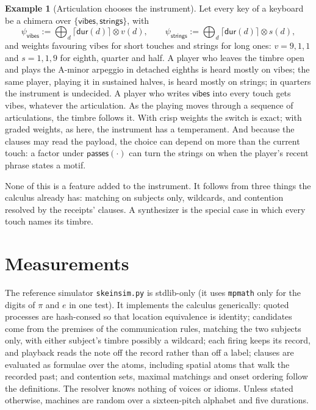 \documentclass[11pt,a4paper]{article}
\theoremstyle{plain}
\theoremstyle{definition}
\newtheorem{example}[theorem]{Example}
\theoremstyle{remark}
\newcommand{\tensorv}{\otimes}
\newcommand{\crisp}[1]{\lceil #1 \rceil}
\newcommand{\atm}[1]{\mathsf{#1}}
\begin{document}
\begin{example}[Articulation chooses the instrument]\label{ex:chimera}
Let every key of a keyboard be a chimera over $\{\mathsf{vibes},
\mathsf{strings}\}$, with
\[
\psi_{\mathsf{vibes}} := \bigoplus_d \crisp{\atm{dur}(d)} \tensorv v(d),
\qquad
\psi_{\mathsf{strings}} := \bigoplus_d \crisp{\atm{dur}(d)} \tensorv s(d),
\]
and weights favouring vibes for short touches and strings for long ones:
$v = 9, 1, 1$ and $s = 1, 1, 9$ for eighth, quarter and half. A player who
leaves the timbre open and plays the A-minor arpeggio in detached eighths is
heard mostly on vibes; the same player, playing it in sustained halves, is heard
mostly on strings; in quarters the instrument is undecided. A player who writes
$\mathsf{vibes}$ into every touch gets vibes, whatever the articulation. As the
playing moves through a sequence of articulations, the timbre follows it. With
crisp weights the switch is exact; with graded weights, as here, the instrument
has a temperament. And because the clauses may read the payload, the choice can
depend on more than the current touch: a factor under $\atm{passes}(\cdot)$ can
turn the strings on when the player's recent phrase states a motif.
\end{example}

None of this is a feature added to the instrument. It follows from three things
the calculus already has: matching on subjects only, wildcards, and contention
resolved by the receipts' clauses. A synthesizer is the special case in which
every touch names its timbre.


\section{Measurements}\label{sec:measured}

The reference simulator \texttt{skeinsim.py} is stdlib-only (it uses
\texttt{mpmath} only for the digits of $\pi$ and $e$ in one test). It
implements the calculus generically: quoted processes are hash-consed so that
location equivalence is identity; candidates come from the premises of the
communication rules, matching the two subjects only, with either subject's timbre possibly a wildcard;
each firing keeps its
record, and playback reads the note off the record rather than off a label;
clauses are evaluated as formulae over the atoms, including
spatial atoms that walk the recorded past; and contention sets, maximal
matchings and onset ordering follow the definitions. The resolver knows nothing
of voices or idioms. Unless stated otherwise, machines are random over a
sixteen-pitch alphabet and five durations.
\end{document}
